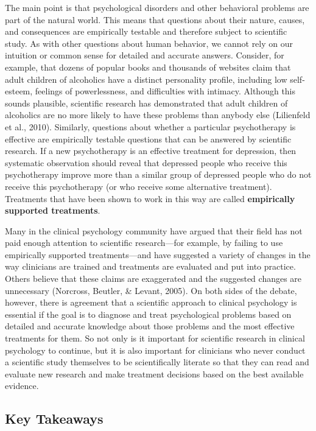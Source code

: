 \documentclass[]{book}
\theoremstyle{definition}
\theoremstyle{definition}
\theoremstyle{remark}
\begin{document}
The main point is that psychological disorders and other behavioral
problems are part of the natural world. This means that questions about
their nature, causes, and consequences are empirically testable and
therefore subject to scientific study. As with other questions about
human behavior, we cannot rely on our intuition or common sense for
detailed and accurate answers. Consider, for example, that dozens of
popular books and thousands of websites claim that adult children of
alcoholics have a distinct personality profile, including low
self-esteem, feelings of powerlessness, and difficulties with intimacy.
Although this sounds plausible, scientific research has demonstrated
that adult children of alcoholics are no more likely to have these
problems than anybody else (Lilienfeld et al., 2010). Similarly,
questions about whether a particular psychotherapy is effective are
empirically testable questions that can be answered by scientific
research. If a new psychotherapy is an effective treatment for
depression, then systematic observation should reveal that depressed
people who receive this psychotherapy improve more than a similar group
of depressed people who do not receive this psychotherapy (or who
receive some alternative treatment). Treatments that have been shown to
work in this way are called \textbf{empirically supported treatments}.

Many in the clinical psychology community have argued that their field
has not paid enough attention to scientific research---for example, by
failing to use empirically supported treatments---and have suggested a
variety of changes in the way clinicians are trained and treatments are
evaluated and put into practice. Others believe that these claims are
exaggerated and the suggested changes are unnecessary (Norcross,
Beutler, \& Levant, 2005). On both sides of the debate, however, there
is agreement that a scientific approach to clinical psychology is
essential if the goal is to diagnose and treat psychological problems
based on detailed and accurate knowledge about those problems and the
most effective treatments for them. So not only is it important for
scientific research in clinical psychology to continue, but it is also
important for clinicians who never conduct a scientific study themselves
to be scientifically literate so that they can read and evaluate new
research and make treatment decisions based on the best available
evidence.

\subsection{Key Takeaways}\label{key-takeaways-3}
\end{document}
